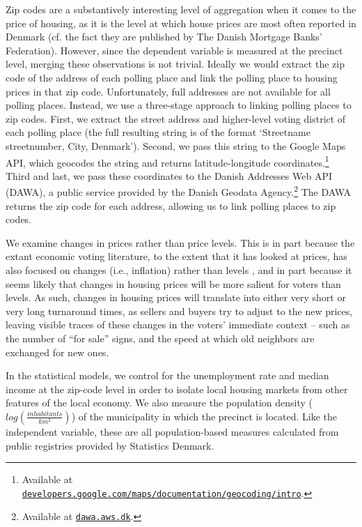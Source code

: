 \documentclass[12pt,a4paper]{article}
\begin{document}
	Zip codes are a substantively interesting level of aggregation when it comes to the price of housing, as it is the level at which house prices are most often reported in Denmark (cf. the fact they are published by The Danish Mortgage Banks' Federation). However, since the dependent variable is measured at the precinct level, merging these observations is not trivial. Ideally we would extract the zip code of the address of each polling place and link the polling place to housing prices in that zip code. Unfortunately, full addresses are not available for all polling places. Instead, we use a three-stage approach to linking polling places to zip codes. First, we extract the street address and higher-level voting district of each polling place (the full resulting string is of the format `Streetname streetnumber, City, Denmark'). Second, we pass this string to the Google Maps API, which geocodes the string and returns latitude-longitude coordinates.\footnote{Available at \texttt{\href{https://developers.google.com/maps/documentation/geocoding/intro}{developers.google.com/maps/documentation/geocoding/intro}}.} Third and last, we pass these coordinates to the Danish Addresses Web API (DAWA), a public service provided by the Danish Geodata Agency.\footnote{Available at \texttt{\href{http://dawa.aws.dk/}{dawa.aws.dk}}.} The DAWA returns the zip code for each address, allowing us to link polling places to zip codes. %
	
	We examine changes in prices rather than price levels. This is in part because the extant economic voting literature, to the extent that it has looked at prices, has also focused on changes (i.e., inflation) rather than levels \citep[cf.][]{kramer1971short}, and in part because it seems likely that changes in housing prices will be more salient for voters than levels. As such, changes in housing prices will translate into either very short or very long turnaround times, as sellers and buyers try to adjust to the new prices, leaving visible traces of these changes in the voters' immediate context -- such as the number of ``for sale'' signs, and the speed at which old neighbors are exchanged for new ones.
	
	In the statistical models, we control for the unemployment rate and median income at the zip-code level in order to isolate local housing markets from other features of the local economy. We also measure the population density ($log(\frac{inhabitants}{km^2})$) of the municipality in which the precinct is located. Like the independent variable, these are all population-based measures calculated from public registries provided by Statistics Denmark.
	
\end{document}
